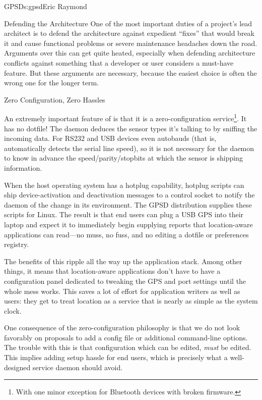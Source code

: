 \begin{aosachapter}{GPSD}{s:gpsd}{Eric Raymond}
\begin{aosasect1}{Defending the Architecture}
One of the most important duties of a project's lead architect is to
defend the architecture against expedient ``fixes'' that would break
it and cause functional problems or severe maintenance headaches
down the road.  Arguments over this can get quite heated,
especially when defending architecture conflicts against something
that a developer or user considers a must-have feature.  But these
arguments are necessary, because the easiest choice is often the wrong
one for the longer term.

\end{aosasect1}

\begin{aosasect1}{Zero Configuration, Zero Hassles}

An extremely important feature of  is that it is a
zero-configuration service\footnote{With one minor exception for
Bluetooth devices with broken firmware.}.  It has no dotfile!  The
daemon deduces the sensor types it's talking to by sniffing the
incoming data.  For RS232 and USB devices  even autobauds
(that is, automatically detects the serial line speed), so it is not
necessary for the daemon to know in advance the speed/parity/stopbits
at which the sensor is shipping information.

When the host operating system has a hotplug capability, hotplug
scripts can ship device-activation and deactivation messages to a
control socket to notify the daemon of the change in its environment.
The GPSD distribution supplies these scripts for Linux.  The result
is that end users can plug a USB GPS into their laptop and expect
it to immediately begin supplying reports that location-aware
applications can read---no muss, no fuss, and no editing a 
dotfile or preferences registry.

The benefits of this ripple all the way up the application stack.
Among other things, it means that location-aware applications don't
have to have a configuration panel dedicated to tweaking the GPS and
port settings until the whole mess works. This saves a lot of effort
for application writers as well as users: they get to treat location
as a service that is nearly as simple as the system clock.

One consequence of the zero-configuration philosophy is that we do not
look favorably on proposals to add a config file or additional
command-line options.  The trouble with this is that configuration
which can be edited, \emph{must} be edited.  This implies adding setup
hassle for end users, which is precisely what a well-designed service
daemon should avoid.


\end{aosasect1}
\end{aosachapter}
